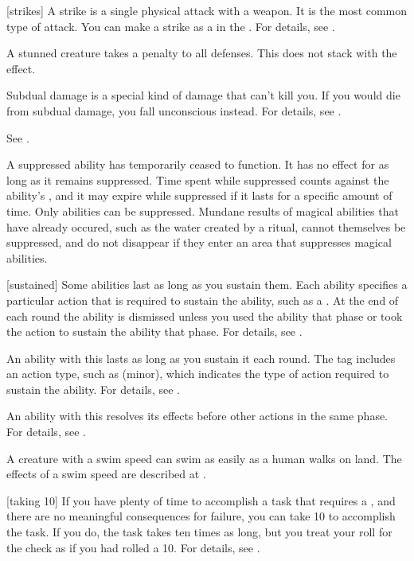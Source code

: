 [strikes] A strike is a single physical attack with a weapon.
It is the most common type of attack.
You can make a strike as a  in the .
For details, see .

 A stunned creature takes a  penalty to all defenses.
This does not stack with the  effect.

 Subdual damage is a special kind of damage that can't kill you.
If you would die from subdual damage, you fall unconscious instead.
For details, see .

 See .

 A suppressed ability has temporarily ceased to function.
It has no effect for as long as it remains suppressed.
Time spent while suppressed counts against the ability's , and it may expire while suppressed if it lasts for a specific amount of time.
Only  abilities can be suppressed.
Mundane results of magical abilities that have already occured, such as the water created by a  ritual, cannot themselves be suppressed, and do not disappear if they enter an area that suppresses magical abilities.

[sustained] Some abilities last as long as you sustain them.
Each ability specifies a particular action that is required to sustain the ability, such as a .
At the end of each round the ability is dismissed unless you used the ability that phase or took the action to sustain the ability that phase.
For details, see .

 An ability with this  lasts as long as you sustain it each round.
The tag includes an action type, such as (minor), which indicates the type of action required to sustain the ability.
For details, see .

 An ability with this  resolves its effects before other actions in the same phase.
For details, see .

 A creature with a swim speed can swim as easily as a human walks on land.
The effects of a swim speed are described at .

[taking 10] If you have plenty of time to accomplish a task that requires a , and there are no meaningful consequences for failure, you can take 10 to accomplish the task.
If you do, the task takes ten times as long, but you treat your roll for the check as if you had rolled a 10.
For details, see .

